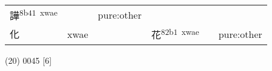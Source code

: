 \documentclass[14pt,a4paper]{scrartcl}
\begin{document}
\begin{longtable}[c]{@{}llllll@{}}
\begin{minipage}[t]{0.14\columnwidth}\raggedright\strut
譁\textsuperscript{8b41~xwae}
\strut\end{minipage} &
\begin{minipage}[t]{0.14\columnwidth}\raggedright\strut
\strut\end{minipage} &
\begin{minipage}[t]{0.14\columnwidth}\raggedright\strut
pure:other
\strut\end{minipage}\tabularnewline
\begin{minipage}[t]{0.14\columnwidth}\raggedright\strut
化
\strut\end{minipage} &
\begin{minipage}[t]{0.14\columnwidth}\raggedright\strut
xwae
\strut\end{minipage} &
\begin{minipage}[t]{0.14\columnwidth}\raggedright\strut
\strut\end{minipage} &
\begin{minipage}[t]{0.14\columnwidth}\raggedright\strut
花\textsuperscript{82b1~xwae}
\strut\end{minipage} &
\begin{minipage}[t]{0.14\columnwidth}\raggedright\strut
\strut\end{minipage} &
\begin{minipage}[t]{0.14\columnwidth}\raggedright\strut
pure:other
\strut\end{minipage}\tabularnewline
\bottomrule
\end{longtable}

(20) 0045 {[}6{]}
\end{document}
